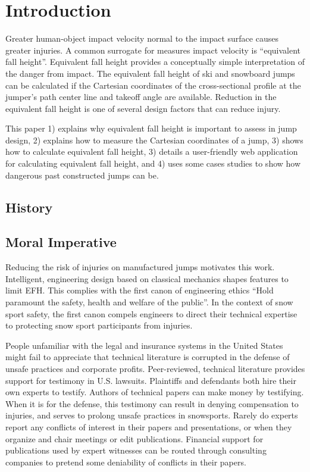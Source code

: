 \documentclass{article}
\begin{document}
\begin{abstract}
\end{abstract}

\section{Introduction}
%
Greater human-object impact velocity normal to the impact surface causes
greater injuries.
A common surrogate for measures impact velocity is ``equivalent fall height''.
Equivalent fall height provides a conceptually simple interpretation of the
danger from impact.
The equivalent fall height of ski and snowboard jumps can be calculated if the
Cartesian coordinates of the cross-sectional profile at the jumper's path
center line and takeoff angle are available.
Reduction in the equivalent fall height is one of several design factors that
can reduce injury.

This paper 1) explains why equivalent fall height is important to assess in
jump design, 2) explains how to measure the Cartesian coordinates of a jump, 3)
shows how to calculate equivalent fall height, 3) details a user-friendly web
application for calculating equivalent fall height, and 4) uses some cases
studies to show how dangerous past constructed jumps can be.

\subsection{History}
%

\subsection{Moral Imperative}
%
Reducing the risk of injuries on manufactured jumps motivates this work.
Intelligent, engineering design based on classical mechanics shapes features to
limit EFH. This complies with the first canon of engineering ethics ``Hold
paramount the safety, health and welfare of the public''. In the context of
snow sport safety, the first canon compels engineers to direct their technical
expertise to protecting snow sport participants from injuries.

People unfamiliar with the legal and insurance systems in the United States
might fail to appreciate that technical literature is corrupted in the defense
of unsafe practices and corporate profits. Peer-reviewed, technical literature
provides support for testimony in U.S. lawsuits. Plaintiffs and defendants both
hire their own experts to testify. Authors of technical papers can make money
by testifying. When it is for the defense, this testimony can result in denying
compensation to injuries, and serves to prolong unsafe practices in snowsports.
Rarely do experts report any conflicts of interest in their papers and
presentations, or when they organize and chair meetings or edit publications.
Financial support for publications used by expert witnesses can be routed
through consulting companies to pretend some deniability of conflicts in their
papers.
\end{document}
